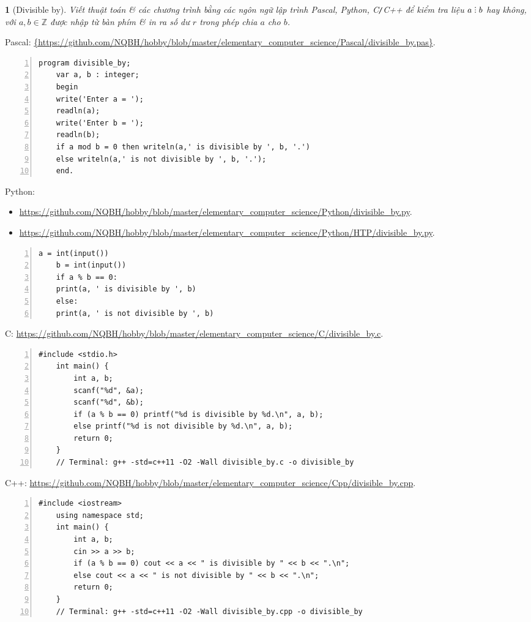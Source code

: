 \documentclass{article}
\newtheorem{baitoan}{}
\DeclareRobustCommand{\divby}{%
	\mathrel{\vbox{\baselineskip.65ex\lineskiplimit0pt\hbox{.}\hbox{.}\hbox{.}}}%
}
\begin{document}
\begin{baitoan}[Divisible by]
	Viết thuật toán \& các chương trình bằng các ngôn ngữ lập trình {\sf Pascal, Python, C{\tt/}C++} để kiểm tra liệu $a\divby b$ hay không, với $a,b\in\mathbb{Z}$ được nhập từ bàn phím \& in ra số dư $r$ trong phép chia $a$ cho $b$.
\end{baitoan}
\noindent Pascal: \url{{https://github.com/NQBH/hobby/blob/master/elementary_computer_science/Pascal/divisible_by.pas}}.
\begin{Verbatim}[numbers=left,xleftmargin=5mm]
	program divisible_by;
	var a, b : integer;
	begin
	write('Enter a = ');
	readln(a);
	write('Enter b = ');
	readln(b);
	if a mod b = 0 then writeln(a,' is divisible by ', b, '.')
	else writeln(a,' is not divisible by ', b, '.');
	end.
\end{Verbatim}
Python:
\begin{itemize}
	\item \url{https://github.com/NQBH/hobby/blob/master/elementary_computer_science/Python/divisible_by.py}.
	\item \url{https://github.com/NQBH/hobby/blob/master/elementary_computer_science/Python/HTP/divisible_by.py}.
\end{itemize} 
\begin{Verbatim}[numbers=left,xleftmargin=5mm]
	a = int(input())
	b = int(input())
	if a % b == 0:
	print(a, ' is divisible by ', b)
	else:
	print(a, ' is not divisible by ', b)
\end{Verbatim}
C: \url{https://github.com/NQBH/hobby/blob/master/elementary_computer_science/C/divisible_by.c}.
\begin{Verbatim}[numbers=left,xleftmargin=5mm]
	#include <stdio.h>
	int main() {
		int a, b;
		scanf("%d", &a);
		scanf("%d", &b);
		if (a % b == 0) printf("%d is divisible by %d.\n", a, b);
		else printf("%d is not divisible by %d.\n", a, b);
		return 0;
	}
	// Terminal: g++ -std=c++11 -O2 -Wall divisible_by.c -o divisible_by
\end{Verbatim}
C++: \url{https://github.com/NQBH/hobby/blob/master/elementary_computer_science/Cpp/divisible_by.cpp}.
\begin{Verbatim}[numbers=left,xleftmargin=5mm]
	#include <iostream>
	using namespace std;
	int main() {
		int a, b;
		cin >> a >> b;
		if (a % b == 0) cout << a << " is divisible by " << b << ".\n";
		else cout << a << " is not divisible by " << b << ".\n";
		return 0;
	}
	// Terminal: g++ -std=c++11 -O2 -Wall divisible_by.cpp -o divisible_by
\end{Verbatim}
\end{document}

